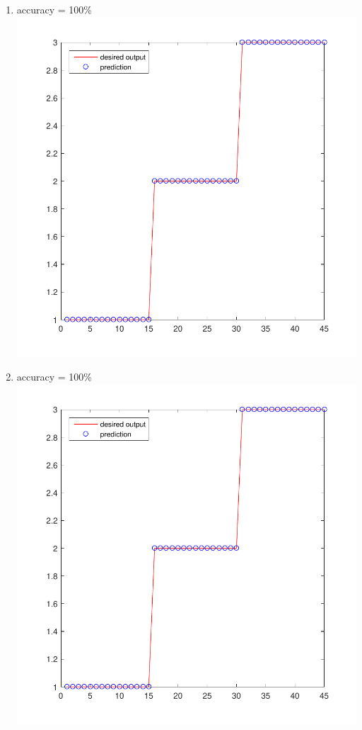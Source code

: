 \documentclass[12pt,a4paper]{article}
\begin{document}
\begin{CJK}{UTF8}{bsmi}
\begin{enumerate}
\begin{enumerate}
\begin{enumerate}
\begin{enumerate}
	\newpage	
	\item accuracy = 100\%\ \\
	\includegraphics[scale=0.6]{irishs1}	
	\item accuracy = 100\%\ \\
	\includegraphics[scale=0.6]{irishs1}		
	\newpage	
\end{enumerate}
	\end{enumerate}


\end{enumerate}
\end{enumerate}
\end{CJK}
\end{document}
